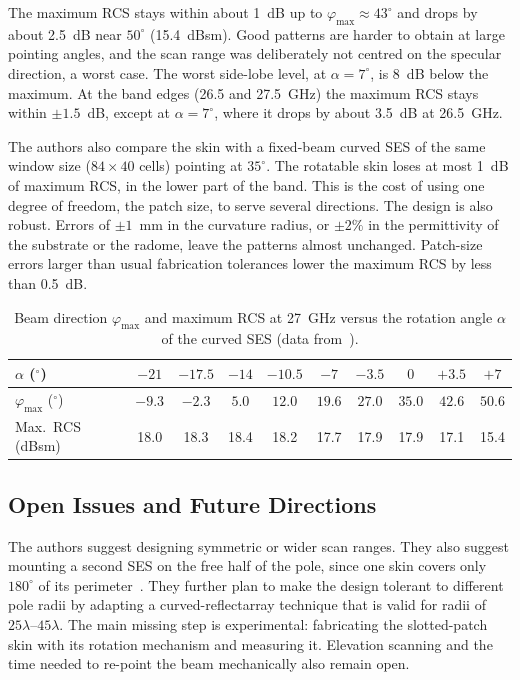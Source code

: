 The maximum RCS stays within about 1~dB up to $\varphi_{\max} \approx 43^\circ$ and drops by about 2.5~dB near $50^\circ$ (15.4~dBsm). Good patterns are harder to obtain at large pointing angles, and the scan range was deliberately not centred on the specular direction, a worst case. The worst side-lobe level, at $\alpha = 7^\circ$, is 8~dB below the maximum. At the band edges (26.5 and 27.5~GHz) the maximum RCS stays within $\pm 1.5$~dB, except at $\alpha = 7^\circ$, where it drops by about 3.5~dB at 26.5~GHz.

The authors also compare the skin with a fixed-beam curved SES of the same window size ($84 \times 40$ cells) pointing at $35^\circ$. The rotatable skin loses at most 1~dB of maximum RCS, in the lower part of the band. This is the cost of using one degree of freedom, the patch size, to serve several directions. The design is also robust. Errors of $\pm 1$~mm in the curvature radius, or $\pm 2\%$ in the permittivity of the substrate or the radome, leave the patterns almost unchanged. Patch-size errors larger than usual fabrication tolerances lower the maximum RCS by less than 0.5~dB.

\begin{table}[!htbp]
    \centering
    \caption[Beam direction and maximum RCS versus rotation angle]{Beam direction $\varphi_{\max}$ and maximum RCS at 27~GHz versus the rotation angle $\alpha$ of the curved SES (data from~\cite{Beccaria2025B}).}
    \label{tab:ch2-scan}
    \small
    \begin{tabular}{l*{9}{c}}
        \toprule
        $\alpha$ ($^\circ$) & $-21$ & $-17.5$ & $-14$ & $-10.5$ & $-7$ & $-3.5$ & $0$ & $+3.5$ & $+7$ \\
        \midrule
        $\varphi_{\max}$ ($^\circ$) & $-9.3$ & $-2.3$ & $5.0$ & $12.0$ & $19.6$ & $27.0$ & $35.0$ & $42.6$ & $50.6$ \\
        Max.\ RCS (dBsm) & 18.0 & 18.3 & 18.4 & 18.2 & 17.7 & 17.9 & 17.9 & 17.1 & 15.4 \\
        \bottomrule
    \end{tabular}
\end{table}

\subsection{Open Issues and Future Directions}
The authors suggest designing symmetric or wider scan ranges. They also suggest mounting a second SES on the free half of the pole, since one skin covers only $180^\circ$ of its perimeter~\cite{Beccaria2025B}. They further plan to make the design tolerant to different pole radii by adapting a curved-reflectarray technique that is valid for radii of $25\lambda$--$45\lambda$. The main missing step is experimental: fabricating the slotted-patch skin with its rotation mechanism and measuring it. Elevation scanning and the time needed to re-point the beam mechanically also remain open.
